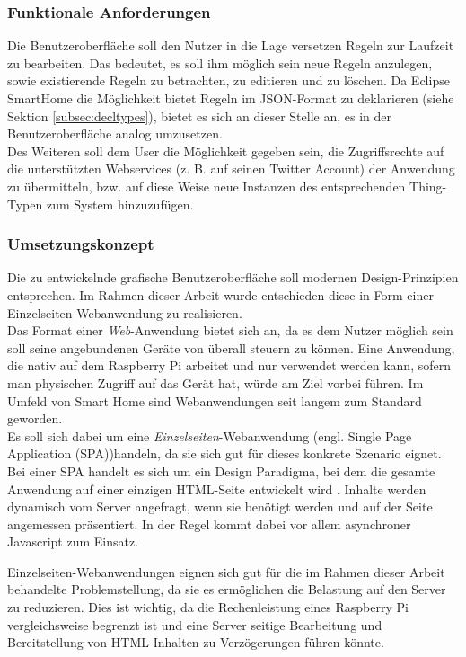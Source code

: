 \subsubsection{Funktionale Anforderungen}
Die Benutzeroberfläche soll den Nutzer in die Lage versetzen Regeln zur Laufzeit zu bearbeiten. Das bedeutet, es soll ihm möglich sein neue Regeln anzulegen, sowie existierende Regeln zu betrachten, zu editieren und zu löschen. Da Eclipse SmartHome die Möglichkeit bietet Regeln im JSON-Format zu deklarieren (siehe Sektion \ref{subsec:decltypes}), bietet es sich an dieser Stelle an, es in der Benutzeroberfläche analog umzusetzen.\\

Des Weiteren soll dem User die Möglichkeit gegeben sein, die Zugriffsrechte auf die unterstützten Webservices (z. B. auf seinen Twitter Account) der Anwendung zu übermitteln, bzw. auf diese Weise neue Instanzen des entsprechenden Thing-Typen zum System hinzuzufügen.

\subsubsection{Umsetzungskonzept}
Die zu entwickelnde grafische Benutzeroberfläche soll modernen Design-Prinzipien entsprechen. Im Rahmen dieser Arbeit wurde entschieden diese in Form einer Einzelseiten-Webanwendung zu realisieren. \\

Das Format einer \textit{Web}-Anwendung bietet sich an, da es dem Nutzer möglich sein soll seine angebundenen Geräte von überall steuern zu können. Eine Anwendung, die nativ auf dem Raspberry Pi arbeitet und nur verwendet werden kann, sofern man physischen Zugriff auf das Gerät hat, würde am Ziel vorbei führen. Im Umfeld von Smart Home sind Webanwendungen seit langem zum Standard geworden.\\

Es soll sich dabei um eine \textit{Einzelseiten}-Webanwendung (engl. Single Page Application (SPA))handeln, da sie sich gut für dieses konkrete Szenario eignet. Bei einer SPA handelt es sich um ein Design Paradigma, bei dem die gesamte Anwendung auf einer einzigen HTML-Seite entwickelt wird \cite{gui_sp}. Inhalte werden dynamisch vom Server angefragt, wenn sie benötigt werden und auf der Seite angemessen präsentiert. In der Regel kommt dabei vor allem asynchroner Javascript zum Einsatz.

Einzelseiten-Webanwendungen eignen sich gut für die im Rahmen dieser Arbeit behandelte Problemstellung, da sie es ermöglichen die Belastung auf den Server zu reduzieren. Dies ist wichtig, da die Rechenleistung eines Raspberry Pi vergleichsweise begrenzt ist und eine Server seitige Bearbeitung und Bereitstellung von HTML-Inhalten zu Verzögerungen führen könnte.\\

